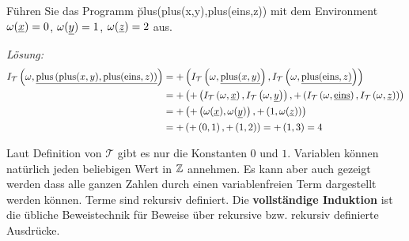 \begin{bsp}
Führen Sie das Programm \u{plus(plus(x,y),plus(eins,z))} mit dem Environment $\omega(\underline{x})=0$, $\omega(\underline{y})=1$, $\omega(\underline{z})=2$ aus.

\textit{Lösung:}
\begin{align*}
I_{\mathcal{T}}\left(\omega,\underline{\operatorname*{plus}\left(\operatorname*{plus}(x,y),\operatorname*{plus}(\operatorname*{eins},z)\right)}\right)
&= +\left(I_{\mathcal{T}}\left(\omega,\underline{\operatorname*{plus}(x,y)}\right),I_{\mathcal{T}}\left(\omega,\underline{\operatorname*{plus}(\operatorname*{eins},z)}\right)\right) \\
&= +\left(+\left(I_{\mathcal{T}}\left(\omega,\underline{x}\right),I_{\mathcal{T}}\left(\omega,\underline{y}\right)\right),+\left(I_{\mathcal{T}}\left(\omega,\underline{\operatorname*{eins}}\right),I_{\mathcal{T}}\left(\omega,\underline{z}\right)\right)\right) \\
&= +\left(+\left(\omega(\underline{x}),\omega(\underline{y})\right),+\left(1,\omega(\underline{z})\right)\right) \\
&= +\left(+\left(0,1\right),+\left(1,2\right)\right) = +\left(1,3\right) = 4
\end{align*}
\end{bsp}

Laut Definition von $\mathcal{T}$ gibt es nur die Konstanten $0$ und $1$. Variablen können natürlich jeden beliebigen Wert in $\mathbb{Z}$ annehmen.
Es kann aber auch gezeigt werden dass alle ganzen Zahlen durch einen variablenfreien Term dargestellt werden können.
Terme sind rekursiv definiert. Die \textbf{vollständige Induktion} ist die übliche Beweistechnik für Beweise über rekursive bzw. rekursiv definierte Ausdrücke.

